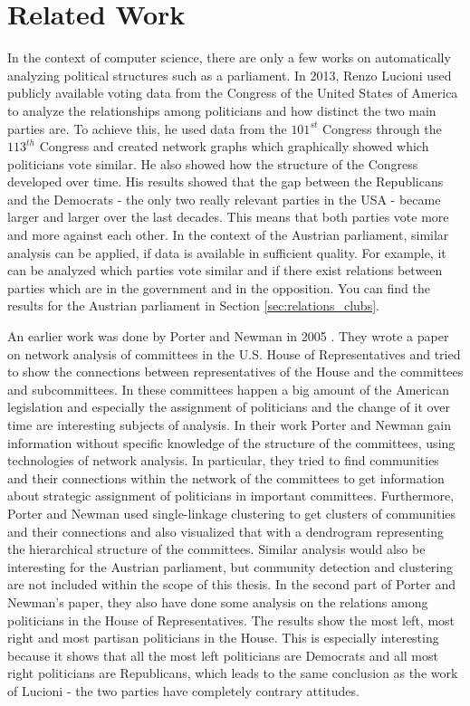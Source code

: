 \chapter{Related Work}
\label{chap:relatedwork}

In the context of computer science, there are only a few works on automatically analyzing political structures such as a parliament. In 2013, Renzo Lucioni \cite{Lucioni_2015} used publicly available voting data from the Congress of the United States of America to analyze the relationships among politicians and how distinct the two main parties are. To achieve this, he used data from the $101^{st}$ Congress through the $113^{th}$ Congress and created network graphs which graphically showed which politicians vote similar. He also showed how the structure of the Congress developed over time. His results showed that the gap between the Republicans and the Democrats - the only two really relevant parties in the USA - became larger and larger over the last decades. This means that both parties vote more and more against each other. In the context of the Austrian parliament, similar analysis can be applied, if data is available in sufficient quality. For example, it can be analyzed which parties vote similar and if there exist relations between parties which are in the government and in the opposition. You can find the results for the Austrian parliament in Section \ref{sec:relations_clubs}.

An earlier work was done by Porter and Newman in 2005 \cite{Porter_2005}. They wrote a paper on network analysis of committees in the U.S. House of Representatives and tried to show the connections between representatives of the House and the committees and subcommittees. In these committees happen a big amount of the American legislation and especially the assignment of politicians and the change of it over time are interesting subjects of analysis. In their work Porter and Newman gain information without specific knowledge of the structure of the committees, using technologies of network analysis. In particular, they tried to find communities and their connections within the network of the committees to get information about strategic assignment of politicians in important committees. Furthermore, Porter and Newman used single-linkage clustering to get clusters of communities and their connections and also visualized that with a dendrogram representing the hierarchical structure of the committees. Similar analysis would also be interesting for the Austrian parliament, but community detection and clustering are not included within the scope of this thesis. In the second part of Porter and Newman's paper, they also have done some analysis on the relations among politicians in the House of Representatives. The results show the most left, most right and most partisan politicians in the House. This is especially interesting because it shows that all the most left politicians are Democrats and all most right politicians are Republicans, which leads to the same conclusion as the work of Lucioni \cite{Lucioni_2015} - the two parties have completely contrary attitudes.

